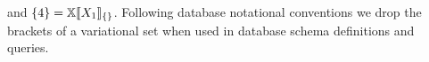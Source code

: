 and \ensuremath{ \setDef {4} = \osetSem [\setDef {}] {\vset_1}}.
%
%
Following database notational conventions
we drop the brackets of a variational set when used in database
schema definitions and queries.

